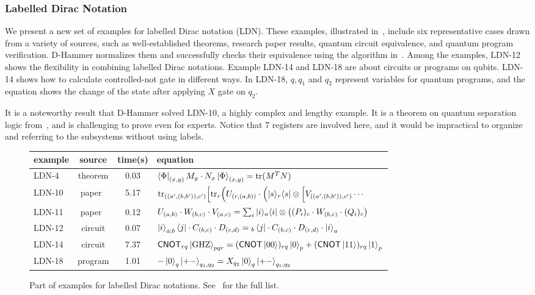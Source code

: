 \subsubsection{Labelled Dirac Notation}
We present a new set of examples for labelled Dirac notation (LDN). These examples, illustrated in~, include six representative cases drawn from a variety of sources, such as well-established theorems, research paper results, quantum circuit equivalence, and quantum program verification.
D-Hammer normalizes them and successfully checks their equivalence using the algorithm in~.
Among the examples, LDN-12 shows the flexibility in combining labelled Dirac notations.
Example LDN-14 and LDN-18 are about circuits or programs on qubits. LDN-14 shows how to calculate controlled-not gate in different ways. In LDN-18, $q, q_1$ and $q_2$ represent variables for quantum programs, and the equation shows the change of the state after applying $X$ gate on $q_2$. 

It is a noteworthy result that D-Hammer solved LDN-10, a highly complex and lengthy example. It is a theorem on quantum separation logic from~\cite{DBLP:conf/lics/ZhouBHYY21}, and is challenging to prove even for experts. Notice that 7 registers are involved here, and it would be impractical to organize and referring to the subsystems without using labels.

\begin{figure}[h]
    \center
    \setlength{\extrarowheight}{2pt}
    \begin{tabular}{l c c l}
        \hline
        example & source & time(s) & equation \\
        \hline
        LDN-4 & theorem & 0.03 & \( \bra{\Phi}_{(x, y)} M_y \cdot N_x \ket{\Phi}_{(x, y)} = \mathrm{tr}(M^T N) \) \\
        LDN-10 & paper~\cite{DBLP:conf/lics/ZhouBHYY21} & 5.17 & \( \mathrm{tr}_{((a',(b,b')),c')}\Big[\mathrm{tr}_{r}\Big(U_{(r,(a,b))} \cdot\Big(|s\rangle_r\langle s|\otimes 
        \Big[V_{((a',(b,b')),c')} \cdots \)\\
        LDN-11 & paper~\cite{PALSBERG2024206} & 0.12 & \( U_{(a,b)}\cdot W_{(b,c)}\cdot V_{(a,c)} = 
        \sum_i |i\rangle_a\langle i|\otimes \big((P_i)_c\cdot W_{(b,c)}\cdot (Q_i)_c\big)\) \\
        LDN-12 & circuit & 0.07 & \( \ket{i}_{a;b}\bra{j} \cdot C_{(b,c)} \cdot D_{(c,d)} = {}_b\bra{j} \cdot C_{(b,c)} \cdot D_{(c,d)} \cdot \ket{i}_{a}\) \\
        LDN-14 & circuit & 7.37 & \scriptsize{\( \textsf{CNOT}_{rq}\ket{\textrm{GHZ}}_{pqr} = (\textsf{CNOT}\ket{00})_{rq}\ket{0}_p + (\textsf{CNOT}\ket{11})_{rq}\ket{1}_p \)} \\
        LDN-18 & program & 1.01 & \( -\ket{0}_q\ket{+-}_{q_1, q_2} = X_{q_2} \ket{0}_q\ket{+-}_{q_1, q_2} \) \\
        \hline
    \end{tabular}
    \caption{Part of examples for labelled Dirac notations. See~ for the full list.}
    \label{fig: labelled examples}
\end{figure}